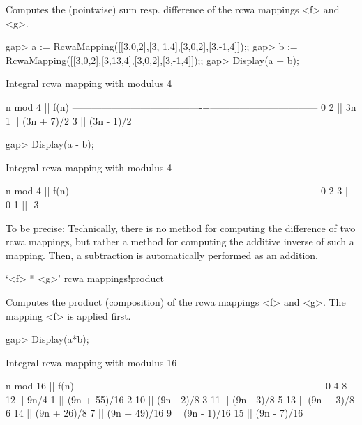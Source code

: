 Computes the (pointwise) sum resp. difference of the rcwa mappings
<f> and <g>.

\beginexample
gap> a := RcwaMapping([[3,0,2],[3, 1,4],[3,0,2],[3,-1,4]]);;
gap> b := RcwaMapping([[3,0,2],[3,13,4],[3,0,2],[3,-1,4]]);;
gap> Display(a + b);

Integral rcwa mapping with modulus 4

               n mod 4                  ||              f(n)              
----------------------------------------+---------------------------------
  0 2                                   || 3n
  1                                     || (3n + 7)/2
  3                                     || (3n - 1)/2

gap> Display(a - b);

Integral rcwa mapping with modulus 4

               n mod 4                  ||              f(n)              
----------------------------------------+---------------------------------
  0 2 3                                 || 0
  1                                     || -3

\endexample

To be precise: Technically, there is no method for computing the
difference of two rcwa mappings, but rather a method for computing
the additive inverse of such a mapping. Then, a subtraction is
automatically performed as an addition.

\>`<f> * <g>' {rcwa mappings!product}

Computes the product (composition) of the rcwa mappings <f> and <g>.
The mapping <f> is applied first.

\beginexample
gap> Display(a*b);

Integral rcwa mapping with modulus 16

               n mod 16                 ||              f(n)              
----------------------------------------+---------------------------------
   0  4  8 12                           || 9n/4
   1                                    || (9n + 55)/16
   2 10                                 || (9n - 2)/8
   3 11                                 || (9n - 3)/8
   5 13                                 || (9n + 3)/8
   6 14                                 || (9n + 26)/8
   7                                    || (9n + 49)/16
   9                                    || (9n - 1)/16
  15                                    || (9n - 7)/16

\endexample

